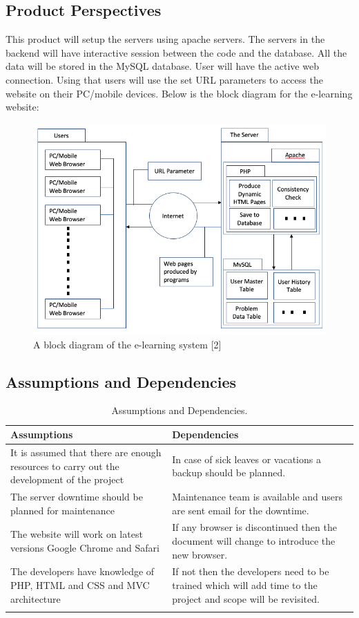 \documentclass{report}
\begin{document}
\subsection{Product Perspectives}
This product will setup the servers using apache servers. The servers in the backend will have interactive session between the code and the database. All the data will be stored in the MySQL database. User will have the active web connection. Using that users will use the set URL parameters to access the website on their PC/mobile devices. Below is the block diagram for the e-learning website:
\begin{figure}[htb!]
    \centering
    \includegraphics[scale=0.4]{1.png}
    \caption{A block diagram of the e-learning system [2] }
    \label{fig:my_label}
\end{figure}


\subsection{Assumptions and Dependencies}
\begin{longtable}{|p{5.5cm}|p{6.5cm}|}
\hline
\textbf{Assumptions} & \textbf{Dependencies} \\ \hline
It is assumed that there are enough resources to carry out the development of the project & In case of sick leaves or vacations a backup should be planned.\\ \hline
The server downtime should be planned for maintenance & Maintenance team is available and users are sent email for the downtime.\\ \hline
The website will work on latest versions Google Chrome and Safari & If any browser is discontinued then the document will change to introduce the new browser.\\ \hline
The developers have knowledge of PHP, HTML and CSS and MVC architecture & If not then the developers need to be trained which will add time to the project and scope will be revisited.\\ \hline
\caption{Assumptions and Dependencies.\label{long}}\\
\end{longtable}
\end{document}
